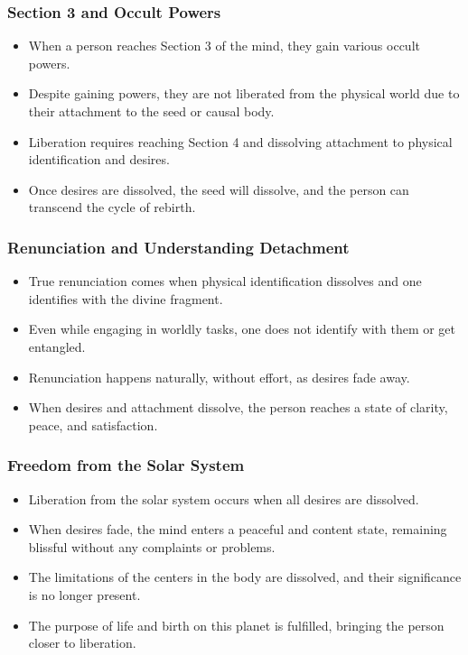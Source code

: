 \begin{frame}[fragile]\frametitle{Section 3 and Occult Powers}
    \begin{itemize}
        \item When a person reaches Section 3 of the mind, they gain various occult powers.
        \item Despite gaining powers, they are not liberated from the physical world due to their attachment to the seed or causal body.
        \item Liberation requires reaching Section 4 and dissolving attachment to physical identification and desires.
        \item Once desires are dissolved, the seed will dissolve, and the person can transcend the cycle of rebirth.
    \end{itemize}
\end{frame}

\begin{frame}[fragile]\frametitle{Renunciation and Understanding Detachment}
    \begin{itemize}
        \item True renunciation comes when physical identification dissolves and one identifies with the divine fragment.
        \item Even while engaging in worldly tasks, one does not identify with them or get entangled.
        \item Renunciation happens naturally, without effort, as desires fade away.
        \item When desires and attachment dissolve, the person reaches a state of clarity, peace, and satisfaction.
    \end{itemize}
\end{frame}

\begin{frame}[fragile]\frametitle{Freedom from the Solar System}
    \begin{itemize}
        \item Liberation from the solar system occurs when all desires are dissolved.
        \item When desires fade, the mind enters a peaceful and content state, remaining blissful without any complaints or problems.
        \item The limitations of the centers in the body are dissolved, and their significance is no longer present.
        \item The purpose of life and birth on this planet is fulfilled, bringing the person closer to liberation.
    \end{itemize}
\end{frame}

